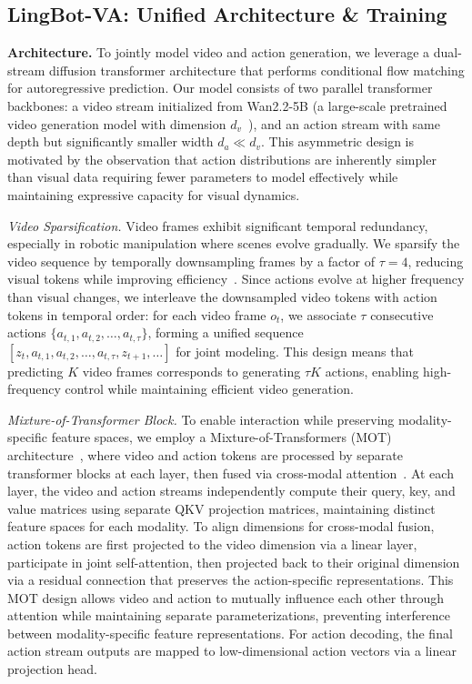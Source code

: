 \documentclass[onecolumn]{robbyant}           %
\newcommand\methodname{LingBot-VA}
\begin{document}
\subsection{\methodname: Unified Architecture \& Training}
\label{sec:architecture}

\noindent\textbf{Architecture.}
To jointly model video and action generation, we leverage a dual-stream diffusion transformer architecture that performs conditional flow matching for autoregressive prediction.
Our model consists of two parallel transformer backbones: a video stream initialized from Wan2.2-5B (a large-scale pretrained video generation model with dimension $d_v$~\cite{wan2024video}), and an action stream with same depth but significantly smaller width $d_a \ll d_v$.
This asymmetric design is motivated by the observation that action distributions are inherently simpler than visual data requiring fewer parameters to model effectively while maintaining expressive capacity for visual dynamics.


\noindent\textit{Video Sparsification.}
Video frames exhibit significant temporal redundancy, especially in robotic manipulation where scenes evolve gradually.
We sparsify the video sequence by temporally downsampling frames by a factor of $\tau=4$, reducing visual tokens while improving efficiency~\cite{motus}.
Since actions evolve at higher frequency than visual changes, we interleave the downsampled video tokens with action tokens in temporal order: for each video frame $o_t$, we associate $\tau$ consecutive actions $\{a_{t,1}, a_{t,2}, \ldots, a_{t,\tau}\}$, forming a unified sequence $[z_t, a_{t,1}, a_{t,2}, \ldots, a_{t,\tau}, z_{t+1}, \ldots]$ for joint modeling.
This design means that predicting $K$ video frames corresponds to generating $\tau K$ actions, enabling high-frequency control while maintaining efficient video generation.

\noindent\textit{Mixture-of-Transformer Block.} To enable interaction while preserving modality-specific feature spaces, we employ a Mixture-of-Transformers (MOT) architecture~\cite{motus,mot,bagel}, where video and action tokens are processed by separate transformer blocks at each layer, then fused via cross-modal attention~\cite{motus}.
At each layer, the video and action streams independently compute their query, key, and value matrices using separate QKV projection matrices, maintaining distinct feature spaces for each modality.
To align dimensions for cross-modal fusion, action tokens are first projected to the video dimension via a linear layer, participate in joint self-attention, then projected back to their original dimension via a residual connection that preserves the action-specific representations.
This MOT design allows video and action to mutually influence each other through attention while maintaining separate parameterizations, preventing interference between modality-specific feature representations.
For action decoding, the final action stream outputs are mapped to low-dimensional action vectors via a linear projection head.
\end{document}
